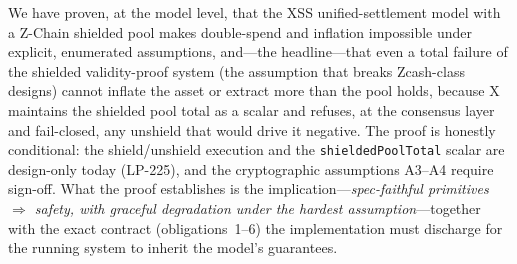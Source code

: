 \documentclass[11pt]{article}
\theoremstyle{definition}
\theoremstyle{remark}
\begin{document}
We have proven, at the model level, that the XSS unified-settlement model
with a Z-Chain shielded pool makes double-spend and inflation impossible
under explicit, enumerated assumptions, and---the headline---that even a
total failure of the shielded validity-proof system (the assumption that
breaks Zcash-class designs) cannot inflate the asset or extract more than
the pool holds, because X maintains the shielded pool total as a scalar and
refuses, at the consensus layer and fail-closed, any unshield that would
drive it negative. The proof is honestly conditional: the shield/unshield
execution and the \texttt{shieldedPoolTotal} scalar are design-only today
(LP-225), and the cryptographic assumptions A3--A4 require sign-off. What
the proof establishes is the implication---\emph{spec-faithful primitives
$\Rightarrow$ safety, with graceful degradation under the hardest
assumption}---together with the exact contract (obligations~1--6) the
implementation must discharge for the running system to inherit the model's
guarantees.
\end{document}
